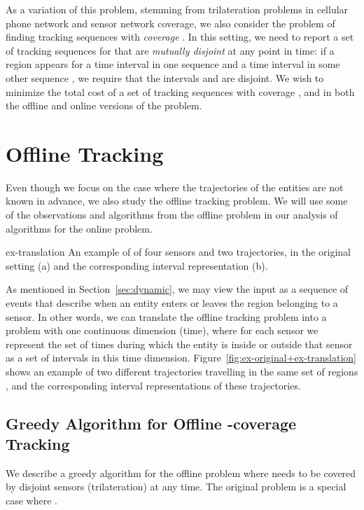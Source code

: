 \documentclass[runningheads]{llncs}
\newcommand{\marrow}{\marginpar[\hfill]{}}
\renewcommand{\remark}[3]{\textcolor{blue}{\textsc{#1 #2:}}
\textcolor{red}{\marrow\textsf{#3}}}
\renewcommand{\remark}[3]{\relax}
\newcommand{\maarten}[2][says]{\remark{Maarten}{#1}{#2}}
\begin{document}
\maarten {I changed this back to the old definition of having  disjoint sequences, because it's not the same thing: we want to allow newer additions to expire before older additions.}

As a variation of this problem, stemming  from trilateration problems in cellular phone network and sensor network coverage, we also consider the problem of finding tracking sequences with \emph{coverage} . In this setting, we need to report a set of  tracking sequences  for  that are \emph {mutually disjoint} at any point in time: if a region  appears for a time interval  in one sequence  and a time interval  in some other sequence , we require that the intervals  and  are disjoint. We wish to minimize the total cost  of a set of tracking sequences with coverage , and in both the offline and online versions of the problem.

\section {Offline Tracking} \label {sec:static}



Even though we focus on the case where the trajectories of the entities are not known in advance, we also study the offline tracking problem. We will use some of the observations and algorithms from the offline problem in our analysis of algorithms for the online problem.

     {ex-translation} {An example of of four sensors and two trajectories, in the original setting (a) and the corresponding interval representation (b).}
  
    As mentioned in Section~\ref {sec:dynamic}, we may view the input as a sequence of events that describe when an entity enters or leaves the region belonging to a sensor.
    In other words, we can translate the offline tracking problem into a problem with one continuous dimension (time), where for each sensor we represent the set of times during which the entity is inside or outside that sensor as a set of intervals in this time dimension.
    Figure~\ref {fig:ex-original+ex-translation} shows an example of two different trajectories travelling in the same set of regions , and the corresponding interval representations of these trajectories.

  \subsection {Greedy Algorithm for Offline -coverage Tracking}
    We describe a greedy algorithm for the offline problem where  needs to be covered by  disjoint sensors (trilateration) at any time. The original problem is a special case where .
    
\end{document}
